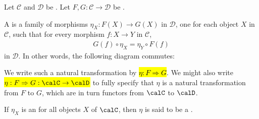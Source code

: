 \begin{definition} \label{definition:natural_transformation_between_functors_between_categories}
Let $\mathcal{C}$ and $\mathcal{D}$ be . 
Let $F, G : \mathcal{C} \to \mathcal{D}$ be .

A  is a family of morphisms $\eta_X: F(X) \to G(X)$ in $\mathcal{D}$, one for each object $X$ in $\mathcal{C}$, such that for every morphism $f: X \to Y$ in $\mathcal{C}$,
\begin{align*}
G(f) \circ \eta_X = \eta_Y \circ F(f)
\end{align*}
in $\mathcal{D}$. In other words, the following diagram commutes:
\begin{center}
\end{center}

We write such a natural transformation by \hl{$\eta: F \Rightarrow G$}. We might also write \hl{$\eta: F \Rightarrow G: \calC \to \calD$} to fully specify that $\eta$ is a natural transformation from $F$ to $G$, which are in turn functors from $\calC$ to $\calD$.  

If $\eta_X$ is an  for all objects $X$ of $\calC$, then $\eta$ is said to be a .
\end{definition}
